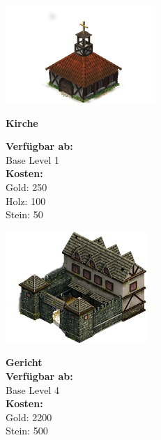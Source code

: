 \documentclass{scrartcl}
\begin{document}
\begin{minipage}{0.3\textwidth}
	\includegraphics[width=\textwidth]{imgChurch.png}
\end{minipage}
\hfill
\begin{minipage}{0.5\textwidth}
	\textbf{Kirche} 
	
	\textbf{Verfügbar ab: }\\ Base Level 1\\
	\textbf{Kosten:
	}\\
	Gold: 250 \\
	Holz: 100\\
	Stein: 50\\
	
\end{minipage}

\begin{minipage}{0.3\textwidth}
	\includegraphics[width=\textwidth]{imgCourt.png}
\end{minipage}
\hfill
\begin{minipage}{0.5\textwidth}
	\textbf{Gericht}\\
	
	\textbf{Verfügbar ab: }\\ Base Level 4\\
	\textbf{Kosten:
	}\\
	Gold: 2200 \\
	Stein: 500\\
	
\end{minipage}
\end{document}
